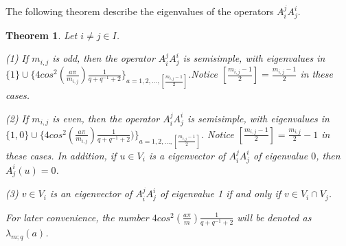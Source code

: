 \def\CTEXPreproc{Created by ctex v0.2.12, don't edit!}\documentclass[11pt]{article}
\newtheorem{thm}{Theorem}[section]
\begin{document}
The following theorem  describe the eigenvalues of the operators  $A^j _i A^i _j$.

\begin{thm} Let $i\neq j \in I$.

\noindent(1) If $m_{i,j}$ is odd, then the operator $A^j _i A^i _j$ is semisimple, with eigenvalues in
$\{1\}\cup \{ 4 cos^2(\frac{a\pi}{m_{i,j}}) \frac{1}{q+q^{-1}+2} \} _{a=1,2,...,[\frac{m_{i,j}-1}{2} ]}$.Notice
$[\frac{m_{i,j}-1}{2} ]=\frac{m_{i,j}-1}{2}$ in these cases.

\noindent(2) If $m_{i,j}$ is even, then the operator $A^j _i A^i _j $ is semisimple, with eigenvalues in
$\{ 1,0\} \cup \{ 4 cos^2(\frac{a\pi} {m_{i,j} }) \frac{1}{q+q^{-1}+2} )  \}_{a=1,2,...,[\frac{m_{i,j}-1}{2} ]}$.
Notice $[\frac{m_{i,j}-1}{2} ]=\frac{m_{i,j}}{2} -1 $ in these cases.
In addition, if $u \in V_i $ is a eigenvector of $A^j _i A^i _j $ of eigenvalue $0$, then $A^i _j (u)=0$.

\noindent(3) $v\in V_i $ is an eigenvector of $A^{j} _i A^{i} _j $ of eigenvalue 1 if and only if $v\in V_i \cap V_j $.

For later convenience, the number $4 cos^2(\frac{a\pi}{m}) \frac{1}{q+q^{-1}+2}$  will be denoted  as $\lambda_{m;q}(a)    $.


\end{thm}
\end{document}
